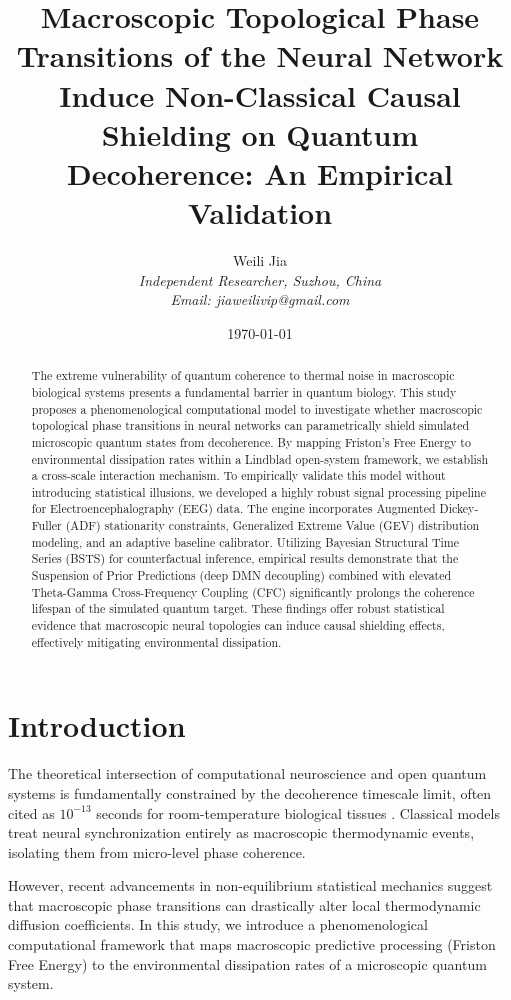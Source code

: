 \documentclass[10pt,twocolumn,letterpaper]{article}
\title{Macroscopic Topological Phase Transitions of the Neural Network Induce Non-Classical Causal Shielding on Quantum Decoherence: An Empirical Validation}
\author{Weili Jia \\
\textit{Independent Researcher, Suzhou, China} \\
\textit{Email: jiaweilivip@gmail.com}}
\date{\today}
\begin{document}
\maketitle

\begin{abstract}
The extreme vulnerability of quantum coherence to thermal noise in macroscopic biological systems presents a fundamental barrier in quantum biology. This study proposes a phenomenological computational model to investigate whether macroscopic topological phase transitions in neural networks can parametrically shield simulated microscopic quantum states from decoherence. By mapping Friston's Free Energy to environmental dissipation rates within a Lindblad open-system framework, we establish a cross-scale interaction mechanism. To empirically validate this model without introducing statistical illusions, we developed a highly robust signal processing pipeline for Electroencephalography (EEG) data. The engine incorporates Augmented Dickey-Fuller (ADF) stationarity constraints, Generalized Extreme Value (GEV) distribution modeling, and an adaptive baseline calibrator. Utilizing Bayesian Structural Time Series (BSTS) for counterfactual inference, empirical results demonstrate that the Suspension of Prior Predictions (deep DMN decoupling) combined with elevated Theta-Gamma Cross-Frequency Coupling (CFC) significantly prolongs the coherence lifespan of the simulated quantum target. These findings offer robust statistical evidence that macroscopic neural topologies can induce causal shielding effects, effectively mitigating environmental dissipation.
\end{abstract}

\section{Introduction}
The theoretical intersection of computational neuroscience and open quantum systems is fundamentally constrained by the decoherence timescale limit, often cited as $10^{-13}$ seconds for room-temperature biological tissues \cite{Tegmark2000}. Classical models treat neural synchronization entirely as macroscopic thermodynamic events, isolating them from micro-level phase coherence.

However, recent advancements in non-equilibrium statistical mechanics suggest that macroscopic phase transitions can drastically alter local thermodynamic diffusion coefficients. In this study, we introduce a phenomenological computational framework that maps macroscopic predictive processing (Friston Free Energy) \cite{Friston2010} to the environmental dissipation rates of a microscopic quantum system. 
\end{document}
